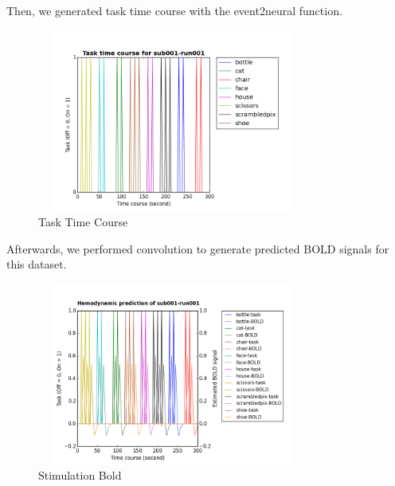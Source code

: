\documentclass[11pt,twocolumn]{article}
\begin{document}
Then, we generated task time course with the event2neural function.
\begin{figure}[h!]
\centering
\includegraphics[width=90mm, height=60mm]{Task_time_course_sub001_run001.png}
\caption{Task Time Course}
\end{figure}

\pagebreak 

Afterwards, we performed convolution to generate predicted BOLD signals for 
this dataset.
\begin{figure}[h!]
\centering
\includegraphics[width=90mm, height=60mm]{sub001_run001_bold_prediction.png}
\caption{Stimulation Bold}
\end{figure}
\end{document}
